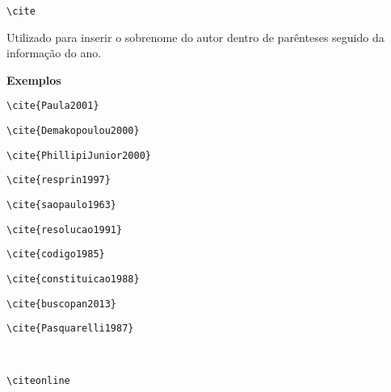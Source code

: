 \begin{alineas}
\item
\begin{verbatim}
\cite
\end{verbatim}

Utilizado para inserir o sobrenome do autor dentro de par\^enteses seguido da informa\c{c}\~ao do ano.

\textbf{Exemplos} 

\begin{verbatim}
\cite{Paula2001}
\end{verbatim}
\cite{Paula2001}

\begin{verbatim}
\cite{Demakopoulou2000}
\end{verbatim}
\cite{Demakopoulou2000}

\begin{verbatim}
\cite{PhillipiJunior2000}
\end{verbatim}
\cite{PhillipiJunior2000}

\begin{verbatim}
\cite{resprin1997}
\end{verbatim}
\cite{resprin1997}

\begin{verbatim}
\cite{saopaulo1963}
\end{verbatim}
\cite{saopaulo1963}

\begin{verbatim}
\cite{resolucao1991}
\end{verbatim}
\cite{resolucao1991}

\begin{verbatim}
\cite{codigo1985}
\end{verbatim}
\cite{codigo1985}

\begin{verbatim}
\cite{constituicao1988}
\end{verbatim}
\cite{constituicao1988}

\begin{verbatim}
\cite{buscopan2013}
\end{verbatim}
\cite{buscopan2013}

\begin{verbatim}
\cite{Pasquarelli1987}
\end{verbatim}
\cite{Pasquarelli1987}\\

\item
\begin{verbatim}
\citeonline
\end{verbatim}


\end{alineas}
